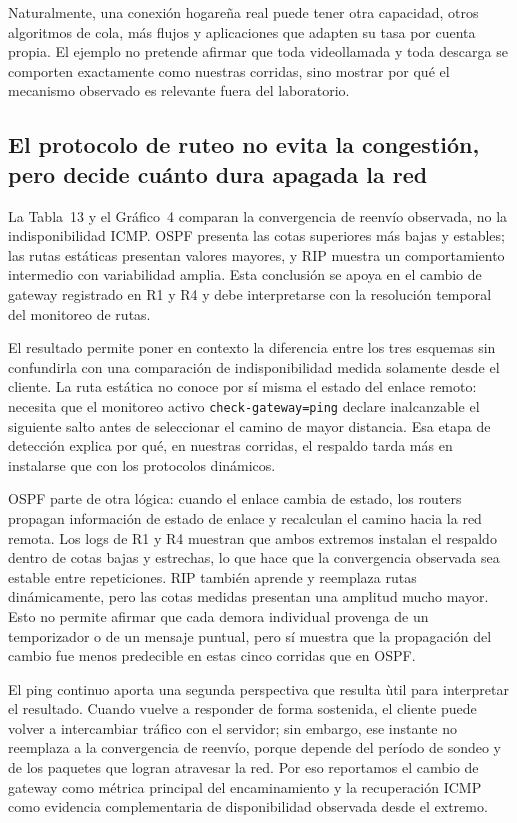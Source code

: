 \documentclass[11pt,a4paper]{article}
\begin{document}
Naturalmente, una conexi\'on hogare\~na real puede tener otra capacidad, otros algoritmos de cola, m\'as flujos y aplicaciones que adapten su tasa por cuenta propia. El ejemplo no pretende afirmar que toda videollamada y toda descarga se comporten exactamente como nuestras corridas, sino mostrar por qu\'e el mecanismo observado es relevante fuera del laboratorio.

\subsection*{El protocolo de ruteo no evita la congesti\'on, pero decide cu\'anto dura apagada la red}

La Tabla~13 y el Gr\'afico~4 comparan la convergencia de reenv\'io observada, no la indisponibilidad ICMP. OSPF presenta las cotas superiores m\'as bajas y estables; las rutas est\'aticas presentan valores mayores, y RIP muestra un comportamiento intermedio con variabilidad amplia. Esta conclusi\'on se apoya en el cambio de gateway registrado en R1 y R4 y debe interpretarse con la resoluci\'on temporal del monitoreo de rutas.


El resultado permite poner en contexto la diferencia entre los tres esquemas sin confundirla con una comparaci\'on de indisponibilidad medida solamente desde el cliente. La ruta est\'atica no conoce por s\'i misma el estado del enlace remoto: necesita que el monitoreo activo \texttt{check-gateway=ping} declare inalcanzable el siguiente salto antes de seleccionar el camino de mayor distancia. Esa etapa de detecci\'on explica por qu\'e, en nuestras corridas, el respaldo tarda m\'as en instalarse que con los protocolos din\'amicos.

OSPF parte de otra l\'ogica: cuando el enlace cambia de estado, los routers propagan informaci\'on de estado de enlace y recalculan el camino hacia la red remota. Los logs de R1 y R4 muestran que ambos extremos instalan el respaldo dentro de cotas bajas y estrechas, lo que hace que la convergencia observada sea estable entre repeticiones. RIP tambi\'en aprende y reemplaza rutas din\'amicamente, pero las cotas medidas presentan una amplitud mucho mayor. Esto no permite afirmar que cada demora individual provenga de un temporizador o de un mensaje puntual, pero s\'i muestra que la propagaci\'on del cambio fue menos predecible en estas cinco corridas que en OSPF.

El ping continuo aporta una segunda perspectiva que resulta \`util para interpretar el resultado. Cuando vuelve a responder de forma sostenida, el cliente puede volver a intercambiar tr\'afico con el servidor; sin embargo, ese instante no reemplaza a la convergencia de reenv\'io, porque depende del per\'iodo de sondeo y de los paquetes que logran atravesar la red. Por eso reportamos el cambio de gateway como m\'etrica principal del encaminamiento y la recuperaci\'on ICMP como evidencia complementaria de disponibilidad observada desde el extremo.
\end{document}
